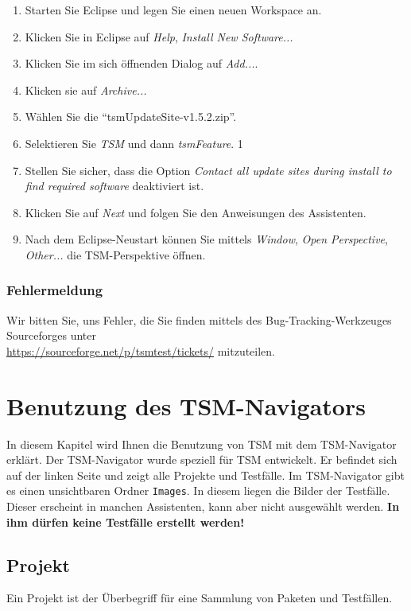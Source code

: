 \documentclass[11pt,a4paper,titlepage]{article}
\begin{document}
\begin{enumerate}
 \item Starten Sie Eclipse und legen Sie einen neuen Workspace an.
 \item Klicken Sie in Eclipse auf \textit{Help}, \textit{Install New Software...}
 \item Klicken Sie im sich öffnenden Dialog auf \textit{Add...}.
 \item Klicken sie auf \textit{Archive...}
 \item Wählen Sie die "`tsmUpdateSite-v1.5.2.zip"'.
 \item Selektieren Sie \textit{TSM} und dann \textit{tsmFeature}. 1
 \item Stellen Sie sicher, dass die Option \textit{Contact all update sites during install to find required software} deaktiviert ist.
 \item Klicken Sie auf \textit{Next} und folgen Sie den Anweisungen des Assistenten.
 \item Nach dem Eclipse-Neustart können Sie mittels \textit{Window}, \textit{Open Perspective}, \textit{Other...} die TSM-Perspektive öffnen.
\end{enumerate}

\subsubsection{Fehlermeldung}
Wir bitten Sie, uns Fehler, die Sie finden mittels des Bug-Tracking-Werkzeuges Sourceforges unter \\ \href{https://sourceforge.net/p/tsmtest/tickets/}
{https://sourceforge.net/p/tsmtest/tickets/} mitzuteilen.

\section{Benutzung des TSM-Navigators}
In diesem Kapitel wird Ihnen die Benutzung von TSM mit dem TSM-Navigator erklärt. Der TSM-Navigator wurde speziell für TSM entwickelt.
Er befindet sich auf der linken Seite und zeigt alle Projekte und Testfälle. Im TSM-Navigator gibt es einen unsichtbaren Ordner \texttt{Images}. In diesem liegen die Bilder der Testfälle.
Dieser erscheint in manchen Assistenten, kann aber nicht ausgewählt werden. \textbf{In ihm dürfen keine Testfälle erstellt werden!}

\subsection{Projekt}
Ein Projekt ist der Überbegriff für eine Sammlung von Paketen und Testfällen.
\end{document}

